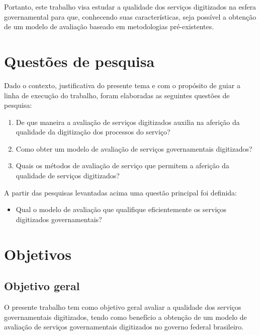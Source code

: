 Portanto, este trabalho visa estudar a qualidade dos serviços digitizados na esfera governamental para que, conhecendo suas características, seja possível a obtenção de um modelo de avaliação baseado em metodologias pré-existentes. 


\section{Questões de pesquisa}

Dado o contexto, justificativa do presente tema e com o propósito de guiar a linha de execução do trabalho, foram elaboradas as seguintes questões de pesquisa:
\begin{enumerate}
	\item De que maneira a avaliação de serviços digitizados auxilia na aferição da qualidade da digitização dos processos do serviço?

	\item Como obter um modelo de avaliação de serviços governamentais digitizados?

	\item Quais os métodos de avaliação de serviço que permitem a aferição da qualidade de serviços digitizados?
\end{enumerate}

A partir das pesquisas levantadas acima uma questão principal foi definida:

\begin{itemize}
	\item Qual o modelo de avaliação que qualifique eficientemente os serviços digitizados governamentais?
\end{itemize}

\section{Objetivos}
\subsection{Objetivo geral}
	O presente trabalho tem como objetivo geral avaliar a qualidade dos serviços governamentais digitizados, tendo como benefício a obtenção de um modelo de avaliação de serviços governamentais digitizados no governo federal brasileiro.